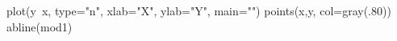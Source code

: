 \begin{Schunk}
\begin{Sinput}
 plot(y~x, type="n", xlab="X", ylab="Y", main="")
 points(x,y, col=gray(.80))
 abline(mod1)
\end{Sinput}
\end{Schunk}
